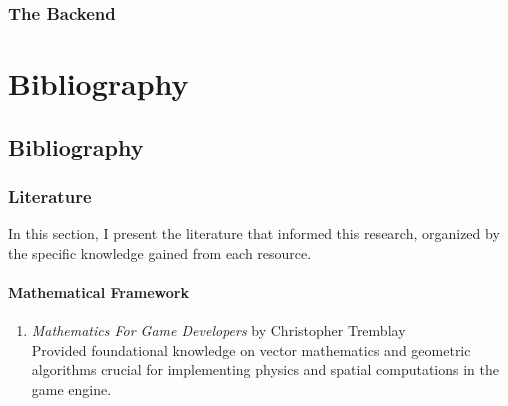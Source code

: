 \documentclass[12pt twoside]{report}
\begin{document}
        \section*{The Backend}
          
          \pagebreak
          

          
          \pagebreak
          
          

          \pagebreak

          

    \part{Bibliography}
      \chapter*{Bibliography}

        \section*{Literature}

In this section, I present the literature that informed this research, organized by the specific knowledge gained from each resource.
        \subsection*{Mathematical Framework}
        \begin{enumerate}
            \item \textit{Mathematics For Game Developers} by Christopher Tremblay \\
            Provided foundational knowledge on vector mathematics and geometric algorithms crucial for implementing physics and spatial computations in the game engine.
        \end{enumerate}
\end{document}
